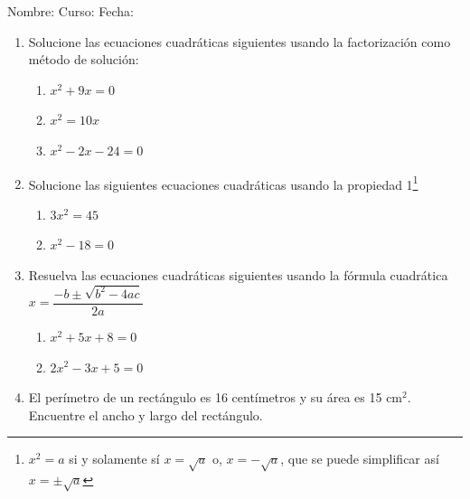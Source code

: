 \documentclass[fleqn]{article}
\newcommand{\LineaNombre}{%
\par
\vspace{\baselineskip}
Nombre:\hrulefill \; Curso: \underline{\hspace*{48pt}} \; Fecha: \underline{\hspace*{2.5cm}} \relax
\par}
\begin{document}
\LineaNombre
\begin{enumerate}
 \item Solucione las ecuaciones cuadráticas siguientes usando la factorización como método de solución:
 \begin{enumerate}
 \item $x^{2}+9x=0$\noanswer
\item $x^{2}=10x$ \noanswer
\item $x^{2}-2x-24=0$\noanswer
 \end{enumerate}
 \item Solucione las siguientes ecuaciones cuadráticas usando la propiedad 1\footnote{$x^{2}=a$ si y solamente sí $x=\sqrt{a}$ o, $x=-\sqrt{a}$, que se puede simplificar así $x=\pm\sqrt{a}$}
 \begin{enumerate}
 \item $3x^{2}=45$\noanswer
\item $x^{2}-18=0$\noanswer
 \end{enumerate}
 \newpage
 \item Resuelva las ecuaciones cuadráticas siguientes usando la fórmula cuadrática $x=\dfrac{-b\pm\sqrt{b^{2}-4ac}}{2a}$
 \begin{enumerate}
 \item $x^{2}+5x+8=0$\noanswer
\item $2x^{2}-3x+5=0$\noanswer
 \end{enumerate}
 \item El perímetro de un rectángulo es 16 centímetros y su área es 15 cm$^{2}$. Encuentre el ancho y largo del rectángulo.\noanswer
 \end{enumerate}
\end{document}
